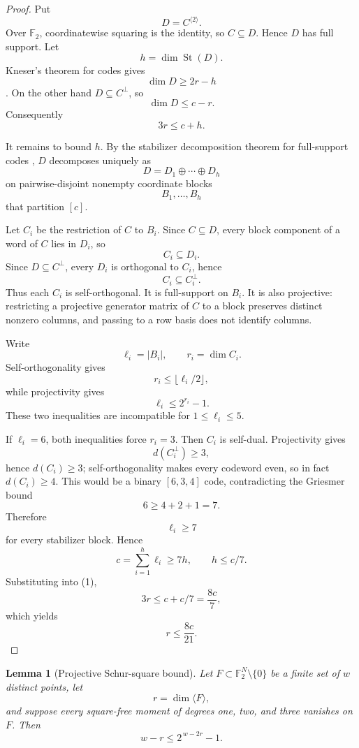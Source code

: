 \documentclass[11pt]{article}
\newtheorem{lemma}[theorem]{Lemma}
\theoremstyle{definition}
\newcommand{\F}{\mathbb F}
\begin{document}
\begin{proof}
Put
\[
D=C^{\langle2\rangle}.
\]
Over \(\F_2\), coordinatewise squaring is the identity, so \(C\subseteq D\). Hence \(D\) has full support. Let
\[
h=\dim\operatorname{St}(D).
\]
Kneser's theorem for codes gives
\[
\dim D\ge 2r-h
\]
\cite{LinZemor2026}. On the other hand \(D\subseteq C^\perp\), so
\[
\dim D\le c-r.
\]
Consequently
\[
3r\le c+h. \tag{1}
\]

It remains to bound \(h\). By the stabilizer decomposition theorem for full-support codes \cite{LinZemor2026}, \(D\) decomposes uniquely as
\[
D=D_1\oplus\cdots\oplus D_h
\]
on pairwise-disjoint nonempty coordinate blocks
\[
B_1,\ldots,B_h
\]
that partition \([c]\).

Let \(C_i\) be the restriction of \(C\) to \(B_i\). Since \(C\subseteq D\), every block component of a word of \(C\) lies in \(D_i\), so
\[
C_i\subseteq D_i.
\]
Since \(D\subseteq C^\perp\), every \(D_i\) is orthogonal to \(C_i\), hence
\[
C_i\subseteq C_i^\perp.
\]
Thus each \(C_i\) is self-orthogonal. It is full-support on \(B_i\). It is also projective: restricting a projective generator matrix of \(C\) to a block preserves distinct nonzero columns, and passing to a row basis does not identify columns.

Write
\[
\ell_i=|B_i|,\qquad r_i=\dim C_i.
\]
Self-orthogonality gives
\[
r_i\le\lfloor\ell_i/2\rfloor,
\]
while projectivity gives
\[
\ell_i\le2^{r_i}-1.
\]
These two inequalities are incompatible for \(1\le\ell_i\le5\).

If \(\ell_i=6\), both inequalities force \(r_i=3\). Then \(C_i\) is self-dual. Projectivity gives
\[
d(C_i^\perp)\ge3,
\]
hence \(d(C_i)\ge3\); self-orthogonality makes every codeword even, so in fact \(d(C_i)\ge4\). This would be a binary \([6,3,4]\) code, contradicting the Griesmer bound
\[
6\ge4+2+1=7.
\]
Therefore
\[
\ell_i\ge7
\]
for every stabilizer block. Hence
\[
c=\sum_{i=1}^h\ell_i\ge7h,
\qquad
h\le c/7.
\]
Substituting into (1),
\[
3r\le c+c/7=\frac{8c}{7},
\]
which yields
\[
r\le\frac{8c}{21}.
\]
\end{proof}

\begin{lemma}[Projective Schur-square bound]\label{lem:schur}
Let \(F\subset\F_2^N\setminus\{0\}\) be a finite set of \(w\) distinct points, let
\[
r=\dim\langle F\rangle,
\]
and suppose every square-free moment of degrees one, two, and three vanishes on \(F\). Then
\[
w-r\le 2^{\,w-2r}-1.
\]
\end{lemma}
\end{document}
